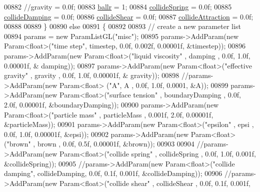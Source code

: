 \begin{DoxyCode}
{{{{{{{00882         \textcolor{comment}{//gravity = 0.0f;}
00883         \hyperlink{particles_8cpp_a46d030c711d3073320681aafbb4c490b}{ballr} = 1;
00884         \hyperlink{particles_8cpp_a3d02873abdeffa306da3e5580d94cd0e}{collideSpring} = 0.0f;
00885         \hyperlink{particles_8cpp_adb598dfbf6a6ca7395c9ff264a5312e0}{collideDamping} = 0.0f;
00886         \hyperlink{particles_8cpp_a5bc1804bc03a9aa78be10ae1b3b8f48b}{collideShear} = 0.0f;
00887         \hyperlink{particles_8cpp_a58a3407fb69d0b188eb74b37b078629b}{collideAttraction} = 0.0f;
00888 
00889     \}
00890     \textcolor{keywordflow}{else}
00891     \{
00892 
00893         \textcolor{comment}{// create a new parameter list}
00894         params = \textcolor{keyword}{new} ParamListGL(\textcolor{stringliteral}{"misc"});
00895         params->AddParam(\textcolor{keyword}{new} Param<\textcolor{keywordtype}{float}>(\textcolor{stringliteral}{"time step"}, timestep, 0.0f, 0.002f, 0.00001f, &timestep));
00896         params->AddParam(\textcolor{keyword}{new} Param<\textcolor{keywordtype}{float}>(\textcolor{stringliteral}{"liquid viscosity"}  , damping , 0.0f, 1.0f, 0.00001f, &
      damping));
00897         params->AddParam(\textcolor{keyword}{new} Param<\textcolor{keywordtype}{float}>(\textcolor{stringliteral}{"effective gravity"}  , gravity , 0.0f, 1.0f, 0.00001f, &
      gravity));
00898         \textcolor{comment}{//params->AddParam(new Param<float> ("A", A , 0.0f, 1.0f, 0.0001, &A));}
00899                 params->AddParam(\textcolor{keyword}{new} Param<\textcolor{keywordtype}{float}>(\textcolor{stringliteral}{"surface tension"}  , boundaryDamping , 0.0f, 2.0f, 
      0.00001f, &boundaryDamping));
00900                 params->AddParam(\textcolor{keyword}{new} Param<\textcolor{keywordtype}{float}>(\textcolor{stringliteral}{"particle mass"}  , particleMass , 0.001f, 2.0f, 
      0.00001f, &particleMass));
00901                 params->AddParam(\textcolor{keyword}{new} Param<\textcolor{keywordtype}{float}>(\textcolor{stringliteral}{"epsilon"}  , epsi , 0.0f, 1.0f, 0.00001f, &epsi));
00902                 params->AddParam(\textcolor{keyword}{new} Param<\textcolor{keywordtype}{float}>(\textcolor{stringliteral}{"brown"}  , brown , 0.0f, 0.5f, 0.00001f, &brown));
00903 
00904         \textcolor{comment}{//params->AddParam(new Param<float>("collide spring" , collideSpring , 0.0f, 1.0f, 0.001f,
       &collideSpring));}
00905         \textcolor{comment}{//params->AddParam(new Param<float>("collide damping", collideDamping, 0.0f, 0.1f, 0.001f,
       &collideDamping));}
00906         \textcolor{comment}{//params->AddParam(new Param<float>("collide shear"  , collideShear  , 0.0f, 0.1f, 0.001f,
}}}}}}}}
\end{DoxyCode}
